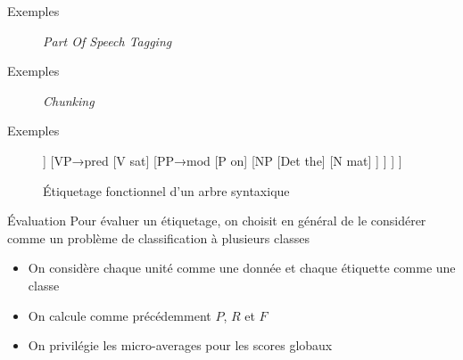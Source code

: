 \documentclass[../allslides.tex]{subfiles}
\begin{document}
\begin{frame}[fragile=singleslide]{Exemples}
	\begin{figure}
		\tikzset{external/export=true}
		\caption{\emph{Part Of Speech Tagging}}
	\end{figure}
\end{frame}

\begin{frame}[fragile=singleslide]{Exemples}
	\begin{figure}
		\tikzset{external/export=true}
		\caption{\emph{Chunking}}
	\end{figure}
\end{frame}

\begin{frame}[fragile=singleslide]{Exemples}
	\begin{figure}
		\tikzset{external/export=true}
		\begin{forest}
			[S
				[NP→\textcolor{highlighta}{sub}
					[Det the]
					[N cat]
				]
				[VP→\textcolor{highlighta}{pred}
					[V sat]
					[PP→\textcolor{highlighta}{mod}
						[P on]
						[NP
							[Det the]
							[N mat]
						]
					]
				]
			]
		\end{forest}
		\caption{\textcolor{highlighta}{Étiquetage fonctionnel} d'un arbre syntaxique}
	\end{figure}
\end{frame}

\begin{frame}{Évaluation}
	Pour évaluer un étiquetage, on choisit en général de le considérer comme un problème de classification à plusieurs classes
	\begin{itemize}
		\item On considère chaque unité comme une donnée et chaque étiquette comme une classe
		\item On calcule comme précédemment \(P\), \(R\) et \(F\)
		\item On privilégie les micro-averages pour les scores globaux
	\end{itemize}
\end{frame}
\end{document}
